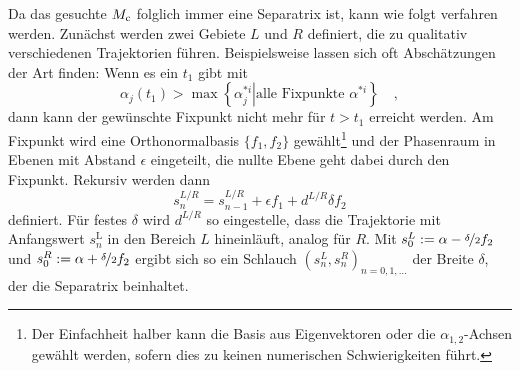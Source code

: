     Da das gesuchte $M_\text{c}$ folglich immer eine Separatrix ist, kann wie folgt verfahren werden. 
    Zunächst werden zwei Gebiete $L$ und $R$ definiert, die zu qualitativ verschiedenen 
    Trajektorien führen. Beispielsweise lassen sich oft Abschätzungen der Art finden: Wenn es 
    ein $t_1$ gibt mit
    \begin{equation}
     \alpha_j(t_1) > \max \left\{ \left. \alpha^{*i}_j \right|\text{alle Fixpunkte } 
     \alpha^{*i}\right\} \quad ,
    \end{equation}
    dann kann der gewünschte Fixpunkt nicht mehr für $t>t_1$ erreicht werden.
    Am Fixpunkt wird eine Orthonormalbasis $\{f_1,f_2\}$ gewählt\footnote{Der Einfachheit halber 
    kann die Basis aus Eigenvektoren oder die $\alpha_{1,2}$-Achsen gewählt werden, sofern dies 
    zu keinen numerischen Schwierigkeiten führt.}
    und der Phasenraum in Ebenen mit Abstand $\epsilon$ 
    eingeteilt, die nullte Ebene geht dabei durch den Fixpunkt. Rekursiv werden dann
    \begin{equation}
     s^{L/R}_n = s^{L/R}_{n-1} + \epsilon f_1 + d^{L/R} \delta f_2 
    \end{equation}
    definiert. Für festes $\delta$ wird $d^{L/R}$ so eingestelle, dass die Trajektorie 
    mit Anfangswert $s^\text{L}_n$ in den Bereich $L$ hineinläuft, analog für $R$. 
    Mit $s^L_0:=\alpha-\nicefrac{\delta}{2}  f_2$ und $s^R_0:=\alpha+\nicefrac{\delta}{2} f_2$ 
    ergibt sich so ein Schlauch $\left(s^{L}_n,s^R_n \right)_{n=0,1,\ldots}$ der Breite 
    $\delta$, der die Separatrix beinhaltet.

    